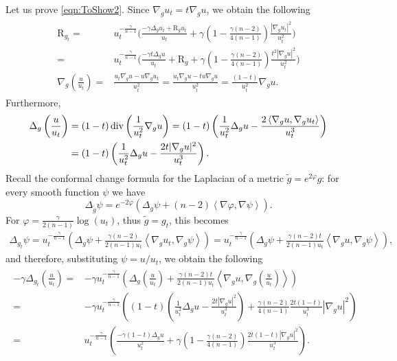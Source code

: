 \documentclass[11pt]{amsart}
\numberwithin{equation}{section}
\newcommand{\scpr}[1]{\left\langle#1\right\rangle}
\newcommand{\scal}{\mathrm{R}}
\newcommand{\Laplace}{\Delta}
\begin{document}
Let us prove \eqref{eqn:ToShow2}. Since $\nabla_g u_t = t\nabla_gu$, we obtain the following
\begin{align*}
  \begin{split}
    \scal_{g_t} ={}& u_t^{-\frac{\gamma}{n-1}}\Biggl(\frac{-\gamma\Delta_g u_t + \scal_{g}u_t}{u_t} + \gamma\left(1-\frac{\gamma(n-2)}{4(n-1)}\right)\frac{|\nabla_g u_t|^2}{u_t^2}\Biggr)\\
      ={}& u_t^{-\frac{\gamma}{n-1}}\Biggl( \frac{-\gamma t\Delta_g u}{u_t} + \scal_{g} + \gamma\left(1-\frac{\gamma(n-2)}{4(n-1)}\right)\frac{t^2|\nabla_g u|^2}{u_t^2}\Biggr) \\
    \nabla_{g}\left(\frac{u}{u_t}\right) ={}& \frac{u_t\nabla_g u - u\nabla_g u_t}{u_t^2} =  \frac{u_t\nabla_g u - t u\nabla_g u}{u_t^2} = \frac{(1-t)}{u_t^2}\nabla_g u.
  \end{split}
\end{align*}
Furthermore,
\begin{align}
  \begin{split}
\Delta_{g}\left(\frac{u}{u_t}\right) ={}& (1-t) \, {\rm div}\left(\frac{1}{u_t^2}\nabla_g u\right) = (1-t)\left(\frac{1}{u_t^2}\Delta_g u - \frac{2\scpr{\nabla_gu,\nabla_gu_t}}{u_t^3}\right)\\
      ={}& (1-t)\left(\frac{1}{u_t^2}\Delta_g u - \frac{2t|\nabla_gu|^2}{u_t^3}\right).
  \end{split}
\end{align}
Recall the conformal change formula for the Laplacian of a metric $\tilde g = e^{2\varphi}g$: for every smooth function $\psi$ we have
\begin{equation}\label{eq:conformal-change-laplace-operator}
  \Laplace_{\tilde g}\psi = e^{-2\varphi}\left(\Laplace_g\psi + (n-2)\scpr{\nabla\varphi,\nabla\psi}\right).
\end{equation}
For $\varphi = \tfrac{\gamma}{2(n-1)}\log(u_t)$, thus $\tilde g = g_t$, this becomes
\begin{align*}
  \Laplace_{g_t}\psi = u_t^{-\frac{\gamma}{n-1}}\left( \Laplace_g\psi + \frac{\gamma(n-2)}{2(n-1)u_t}\scpr{\nabla_gu_t,\nabla_g\psi}\right)= u_t^{-\frac{\gamma}{n-1}}\left(\Laplace_g\psi + \frac{\gamma(n-2)t}{2(n-1)u_t}\scpr{\nabla_gu,\nabla_g\psi}\right),
\end{align*}
and therefore, substituting $\psi=u/u_t$, we obtain the following
\begin{align}
  \begin{split}
    -\gamma\Delta_{g_t}\left(\frac{u}{u_t}\right) ={}& -\gamma u_t^{-\frac{\gamma}{n-1}}\left(\Delta_g\left(\frac{u}{u_t}\right) + \frac{\gamma(n-2)t}{2(n-1)u_t}\scpr{\nabla_g u,\nabla_g \left(\frac{u}{u_t}\right)}\right)\\
      ={}& -\gamma u_t^{-\frac{\gamma}{n-1}}\left( (1-t)\left(\frac{1}{u_t^2}\Delta_g u - \frac{2t|\nabla_gu|^2}{u_t^3}\right) +  \frac{\gamma(n-2)}{4(n-1)}\frac{2t(1-t)}{u_t^3}|\nabla_gu|^2\right) \\
      ={}& u_t^{-\frac{\gamma}{n-1}}\left( \frac{-\gamma(1-t)\Delta_g u}{u_t^2} + \gamma\left(1-\frac{\gamma(n-2)}{4(n-1)}\right)\frac{2t(1-t)|\nabla_gu|^2}{u_t^3}\right).
  \end{split}
\end{align}
\end{document}
